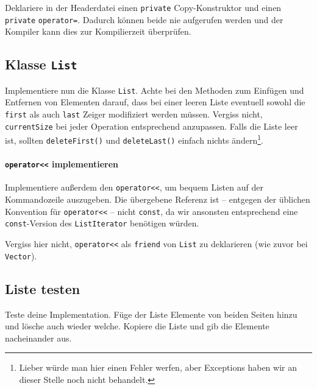 Deklariere in der Headerdatei einen \lstinline{private} Copy-Konstruktor und einen \lstinline{private} \lstinline{operator=}.
Dadurch können beide nie aufgerufen werden und der Kompiler kann dies zur Kompilierzeit überprüfen.



\subsection{Klasse \lstinline{List}}
Implementiere nun die Klasse \lstinline{List}.
Achte bei den Methoden zum Einfügen und Entfernen von Elementen darauf, dass bei einer leeren Liste eventuell sowohl die \lstinline{first} als auch \lstinline{last} Zeiger modifiziert werden müssen.
Vergiss nicht, \lstinline{currentSize} bei jeder Operation entsprechend anzupassen.
Falls die Liste leer ist, sollten \lstinline{deleteFirst()} und \lstinline{deleteLast()} einfach nichts ändern\footnote{Lieber würde man hier einen Fehler werfen, aber Exceptions haben wir an dieser Stelle noch nicht behandelt.}.

\paragraph{\lstinline{operator<<} implementieren}
Implementiere außerdem den \lstinline{operator<<}, um bequem Listen auf der Kommandozeile auszugeben.
Die übergebene Referenz ist -- entgegen der üblichen Konvention für \lstinline{operator<<} -- nicht \lstinline{const}, da wir ansonsten entsprechend eine \lstinline{const}-Version des  \lstinline{ListIterator} benötigen würden.

Vergiss hier nicht, \lstinline{operator<<} als \lstinline{friend} von \lstinline{List} zu deklarieren (wie zuvor bei \lstinline{Vector}).


\subsection{Liste testen}
Teste deine Implementation.
Füge der Liste Elemente von beiden Seiten hinzu und lösche auch wieder welche.
Kopiere die Liste und gib die Elemente nacheinander aus.

